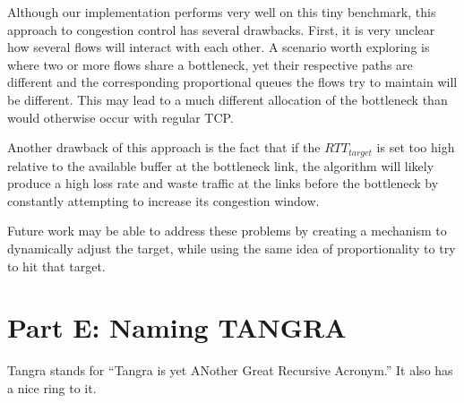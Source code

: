 \documentclass[12pt]{article}
\begin{document}
Although our implementation performs very well on this tiny benchmark, this
approach to congestion control has several drawbacks. First, it is very unclear
how several flows will interact with each other. A scenario worth exploring is
where two or more flows share a bottleneck, yet their respective paths are
different and the corresponding proportional queues the flows try to maintain
will be different. This may lead to a much different allocation of the
bottleneck than would otherwise occur with regular TCP.

Another drawback of this approach is the fact that if the $RTT_{target}$ is set
too high relative to the available buffer at the bottleneck link, the algorithm
will likely produce a high loss rate and waste traffic at the links before the
bottleneck by constantly attempting to increase its congestion window.

Future work may be able to address these problems by creating a mechanism to
dynamically adjust the target, while using the same idea of proportionality to
try to hit that target.

\section*{Part E: Naming TANGRA}

Tangra stands for ``Tangra is yet ANother Great Recursive Acronym.'' It also has
a nice ring to it.

\printbibliography
\end{document}
